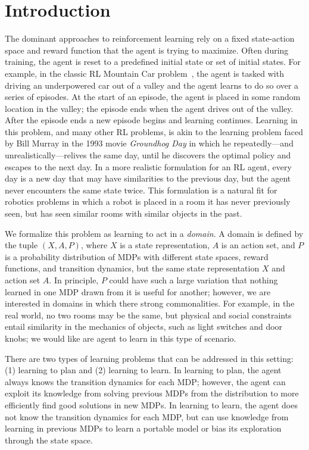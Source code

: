 \section{Introduction}
The dominant approaches to reinforcement learning rely on a fixed state-action space and reward function that the agent is trying to maximize. Often during training, the agent is reset to a predefined initial state or set of initial states. For example, in the classic RL Mountain Car problem~\cite{singh1996reinforcement}, the agent is tasked with driving an underpowered car out of a valley and the agent learns to do so over a series of episodes. At the start of an episode, the agent is placed in some random location in the valley; the episode ends when the agent drives out of the valley. After the episode ends a new episode begins and learning continues. Learning in this problem, and many other RL problems, is akin to the learning problem faced by Bill Murray in the 1993 movie {\em Groundhog Day} in which he repeatedly---and unrealistically---relives the same day, until he discovers the optimal policy and escapes to the next day. In a
more realistic formulation for an RL agent, every day is a new day
that may have similarities to the previous day, but the agent never
encounters the same state twice. This formulation is a natural fit for robotics problems in which a robot is placed in a room it has never previously seen, but has seen similar rooms with similar objects in the past. 

We formalize this problem as learning to act in a {\em domain}. A domain is defined by the tuple $(X, A, P)$, where $X$ is a state representation, $A$ is an action set, and $P$ is a probability distribution of MDPs with different state spaces, reward functions, and transition dynamics, but the same state representation $X$ and action set $A$. In principle, $P$ could have such a large variation that nothing learned in one MDP drawn from it is useful for another; however, we are interested in domains in which there strong commonalities. For example, in the real world, no two rooms may be the same, but physical and social constraints entail similarity in the mechanics of objects, such as light switches and door knobs; we would like are agent to learn in this type of scenario. 

There are two types of learning problems that can be addressed in this setting: (1) learning to plan and (2) learning to learn. In learning to plan, the agent always knows the transition dynamics for each MDP; however, the agent can exploit its knowledge from solving previous MDPs from the distribution to more efficiently find good solutions in new MDPs. In learning to learn, the agent does not know the transition dynamics for each MDP, but can use knowledge from learning in previous MDPs to learn a portable model or bias its exploration through the state space.


